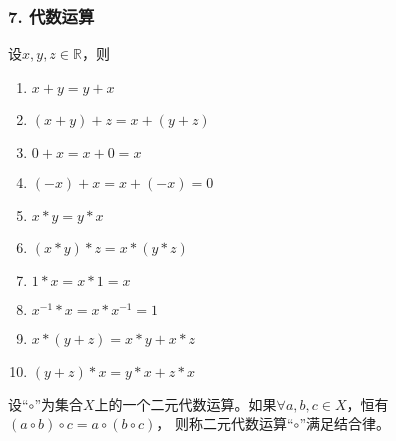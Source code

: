 \documentclass{beamer}
\begin{document}
\begin{CJK*}{UTF8}{gbsn}
\begin{frame}
  \frametitle{7. 代数运算}
  \begin{minipage}[t]{0.49\linewidth}
  \begin{block}{}
    设$x, y, z \in \mathbb{R}$，则
   \begin{enumerate}
   \item   $x + y = y + x$
   \item   $(x + y) + z = x + (y + z)$
   \item   $0 + x = x + 0 = x$
   \item   $(-x) + x =  x + (-x) = 0$
   \item   $x * y = y * x$
   \item   $(x * y) * z = x * (y *z)$
   \item   $1 * x = x * 1 = x$
   \item   $x^{-1} * x = x * x^{-1} = 1$
   \item   $x* (y + z) = x * y + x * z$
   \item   $(y + z) * x = y * x + z * x$
    \end{enumerate}
  \end{block}\pause
\end{minipage}
\begin{minipage}[t]{0.49\linewidth}
  \begin{Def}
    设“$\circ$”为集合$X$上的一个二元代数运算。如果$\forall a, b, c \in X$，恒有$(a \circ b) \circ c = a \circ (b \circ c)$， 则称二元代数运算“$\circ$”满足\alert{结合律}。
  \end{Def}
\end{minipage}
\end{frame}


\end{CJK*}
\end{document}
